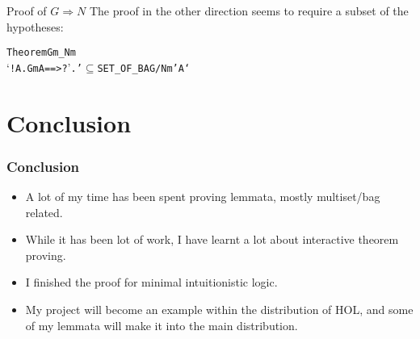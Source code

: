 \documentclass[english,svgnames,hide notes,12pt]{beamer}
\theoremstyle{definition}
\theoremstyle{remark}
\begin{document}




\begin{frame}[fragile]{Proof of $G\Rightarrow N$}
    The proof in the other direction seems to require a subset of the hypotheses:
    \begin{alltt}
Theorem Gm_Nm 
`!\textGamma A. Gm \textGamma A ==> ?\textGamma'. \textGamma' \(\subseteq\) SET_OF_BAG \textGamma /\bs{} Nm \textGamma' A` 
    \end{alltt}
\end{frame}

\section{Conclusion}

\begin{frame}
    \frametitle{Conclusion}
    \begin{itemize}
        \item A lot of my time has been spent proving lemmata, mostly multiset/bag related.
        \item While it has been lot of work, I have learnt a lot about interactive theorem proving.
        \item I finished the proof for minimal intuitionistic logic.
        \item My project will become an example within the distribution of HOL, and some of my lemmata will make it into the main distribution.
    \end{itemize}
\end{frame}
\end{document}

